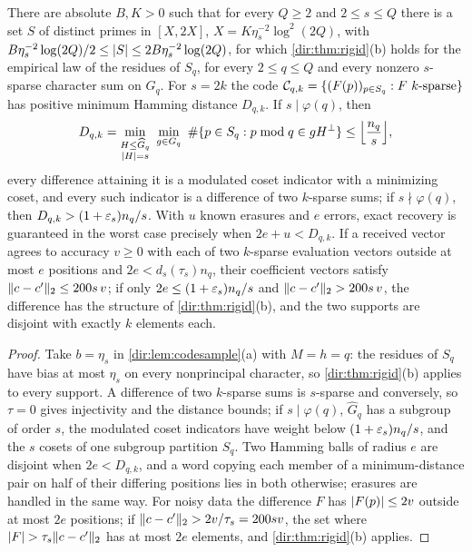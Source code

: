 \begin{theorem}\label{dir:thm:codes}
There are absolute $B,K>0$ such that for every $Q\ge2$ and $2\le s\le Q$ there is a set $S$ of distinct
primes in $[X,2X]$, $X=K\eta_s^{-2}\log^2(2Q)$, with
$B\eta_s^{-2}\log(2Q)/2\le\lvert S\rvert\le2B\eta_s^{-2}\log(2Q)$, for which \cref{dir:thm:rigid}(b) holds for the
empirical law of the residues of $S_q$, for every $2\le q\le Q$ and every nonzero $s$-sparse character sum
on $G_q$. For $s=2k$ the code
$\mathcal C_{q,k}=\{(F(p))_{p\in S_q}:F\text{ $k$-sparse}\}$ has positive minimum Hamming distance $D_{q,k}$.
If $s\mid\varphi(q)$, then
\[
 D_{q,k}=\min_{\substack{H\le\widehat G_q\\\lvert H\rvert=s}}\ \min_{g\in G_q}\ \#\{p\in S_q:p\bmod q\in gH^\perp\}\le\Bigl\lfloor\frac{n_q}s\Bigr\rfloor,
\]
every difference attaining it is a modulated coset indicator with a minimizing coset, and every such
indicator is a difference of two $k$-sparse sums; if $s\nmid\varphi(q)$, then $D_{q,k}>(1+\varepsilon_s)n_q/s$. With
$u$ known erasures and $e$ errors, exact recovery is guaranteed in the worst case precisely when
$2e+u<D_{q,k}$. If a received vector agrees to accuracy $v\ge0$ with each of two $k$-sparse evaluation
vectors outside at most $e$ positions and $2e<d_s(\tau_s)n_q$, their coefficient vectors satisfy
$\lVert c-c'\rVert_2\le200s\,v$; if only $2e\le(1+\varepsilon_s)n_q/s$ and $\lVert c-c'\rVert_2>200s\,v$, the difference has the
structure of \cref{dir:thm:rigid}(b), and the two supports are disjoint with exactly $k$ elements each.
\end{theorem}

\begin{proof}
Take $b=\eta_s$ in \cref{dir:lem:codesample}(a) with $M=h=q$: the residues of $S_q$ have bias at most
$\eta_s$ on every nonprincipal character, so \cref{dir:thm:rigid}(b) applies to every support. A difference of
two $k$-sparse sums is $s$-sparse and conversely, so $\tau=0$ gives injectivity and the distance bounds; if
$s\mid\varphi(q)$, $\widehat G_q$ has a subgroup of order $s$, the modulated coset indicators have weight
below $(1+\varepsilon_s)n_q/s$, and the $s$ cosets of one subgroup partition $S_q$. Two Hamming balls of radius $e$
are disjoint when $2e<D_{q,k}$, and a word copying each member of a minimum-distance pair on half of
their differing positions lies in both otherwise; erasures are handled in the same way. For noisy data the
difference $F$ has $\lvert F(p)\rvert\le2v$ outside at most $2e$ positions; if $\lVert c-c'\rVert_2>2v/\tau_s=200sv$, the set
where $\lvert F\rvert>\tau_s\lVert c-c'\rVert_2$ has at most $2e$ elements, and \cref{dir:thm:rigid}(b) applies.
\end{proof}


